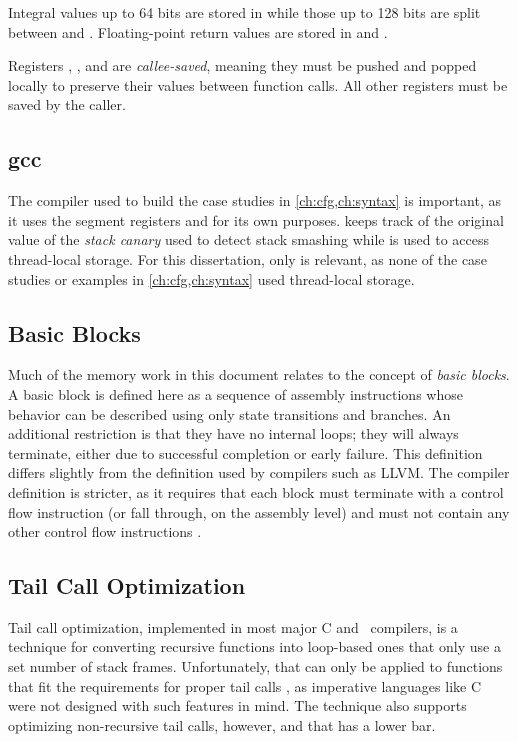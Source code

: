 Integral values up to 64 bits are stored in  while those up to 128 bits
are split between  and .
Floating-point return values are stored in  and .

Registers , , and  are
\emph{callee-saved}, meaning they must be pushed and popped locally to preserve their
values between function calls. All other registers must be saved by the caller.

\subsection{\Ac{gcc}}
The compiler used to build the case studies in \cref{ch:cfg,ch:syntax} is important,
as it uses the segment registers  and  for its own purposes.
 keeps track of the original value of the \emph{stack canary}
used to detect stack smashing \autocite{cowan1998stackguard}
while  is used to access thread-local storage.
For this dissertation, only  is relevant, as none of the case studies
or examples in \cref{ch:cfg,ch:syntax} used thread-local storage.

\subsection{Basic Blocks}
Much of the memory work in this document relates to the concept of \emph{basic blocks}.%
A basic block is defined here as a sequence of assembly instructions
whose behavior can be described using only state transitions and branches.
An additional restriction is that they have no internal loops;
they will always terminate, either due to successful completion or early failure.
This definition differs slightly from the definition used by compilers such as LLVM.
The compiler definition is stricter, as it requires that
each block must terminate with a control flow instruction
(or fall through, on the assembly level)
and must not contain any other control flow instructions
\autocite{llvm:functions,llvm:terminators}.

\subsection{Tail Call Optimization}
Tail call%
optimization, implemented in most major C and \Cpp\ compilers, is a technique
for converting recursive functions into loop-based ones that only use
a set number of stack frames.
Unfortunately, that can only be applied to functions that fit the requirements
for proper tail calls \autocite{probst2001proper},
as imperative languages like C were not designed with such features in mind.
The technique also supports optimizing non-recursive tail calls, however,
and that has a lower bar.

